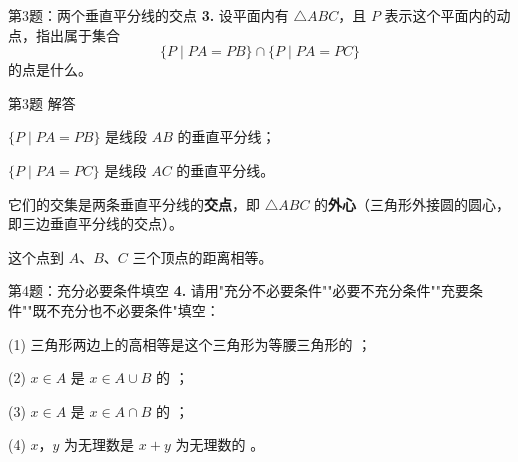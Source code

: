 \documentclass[10pt,aspectratio=169,serif]{beamer}
\begin{document}
\begin{frame}[t]{第3题：两个垂直平分线的交点}
\textbf{3.} 设平面内有 $\triangle ABC$，且 $P$ 表示这个平面内的动点，指出属于集合
\[
\{P \mid PA = PB\} \cap \{P \mid PA = PC\}
\]
的点是什么。
\end{frame}

\begin{frame}[t]{第3题 解答}
\begin{tcolorbox}[colback=orange!10,colframe=orange,title=\textbf{解}]
$\{P \mid PA = PB\}$ 是线段 $AB$ 的垂直平分线；

\vspace{0.3em}
$\{P \mid PA = PC\}$ 是线段 $AC$ 的垂直平分线。

\vspace{0.8em}
它们的交集是两条垂直平分线的\textbf{交点}，即 $\triangle ABC$ 的\textbf{外心}（三角形外接圆的圆心，即三边垂直平分线的交点）。

\vspace{0.3em}
这个点到 $A$、$B$、$C$ 三个顶点的距离相等。
\end{tcolorbox}
\end{frame}

\begin{frame}[t]{第4题：充分必要条件填空}
\textbf{4.} 请用"充分不必要条件""必要不充分条件""充要条件""既不充分也不必要条件"填空：

\vspace{0.5em}
(1) 三角形两边上的高相等是这个三角形为等腰三角形的 \underline{\hspace{3cm}}；

\vspace{0.5em}
(2) $x \in A$ 是 $x \in A \cup B$ 的 \underline{\hspace{3cm}}；

\vspace{0.5em}
(3) $x \in A$ 是 $x \in A \cap B$ 的 \underline{\hspace{3cm}}；

\vspace{0.5em}
(4) $x$，$y$ 为无理数是 $x + y$ 为无理数的 \underline{\hspace{3cm}}。
\end{frame}
\end{document}
